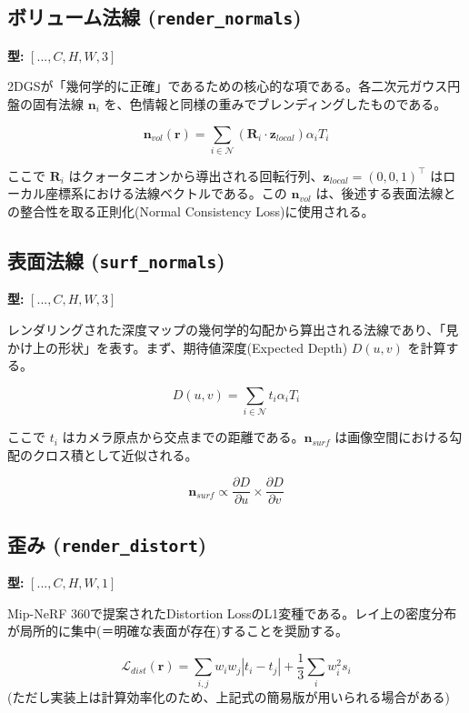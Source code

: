 \subsection{ボリューム法線 (\texttt{render\_normals})}
\textbf{型:} $[..., C, H, W, 3]$

2DGSが「幾何学的に正確」であるための核心的な項である。各二次元ガウス円盤の固有法線 $\bm{n}_i$ を、色情報と同様の重みでブレンディングしたものである。

\begin{equation}
    \bm{n}_{vol}(\bm{r}) = \sum_{i \in \mathcal{N}} (\bm{R}_i \cdot \bm{z}_{local}) \alpha_i T_i
\end{equation}

ここで $\bm{R}_i$ はクォータニオンから導出される回転行列、$\bm{z}_{local} = (0,0,1)^\top$ はローカル座標系における法線ベクトルである。この $\bm{n}_{vol}$ は、後述する表面法線との整合性を取る正則化(Normal Consistency Loss)に使用される。

\subsection{表面法線 (\texttt{surf\_normals})}
\textbf{型:} $[..., C, H, W, 3]$

レンダリングされた深度マップの幾何学的勾配から算出される法線であり、「見かけ上の形状」を表す。まず、期待値深度(Expected Depth) $D(u,v)$ を計算する。

\begin{equation}
    D(u, v) = \sum_{i \in \mathcal{N}} t_i \alpha_i T_i
\end{equation}

ここで $t_i$ はカメラ原点から交点までの距離である。$\bm{n}_{surf}$ は画像空間における勾配のクロス積として近似される。

\begin{equation}
    \bm{n}_{surf} \propto \frac{\partial D}{\partial u} \times \frac{\partial D}{\partial v}
\end{equation}

\subsection{歪み (\texttt{render\_distort})}
\textbf{型:} $[..., C, H, W, 1]$

Mip-NeRF 360で提案されたDistortion LossのL1変種である。レイ上の密度分布が局所的に集中(＝明確な表面が存在)することを奨励する。

\begin{equation}
    \mathcal{L}_{dist}(\bm{r}) = \sum_{i, j} w_i w_j |t_i - t_j| + \frac{1}{3} \sum_i w_i^2 s_i
\end{equation}
(ただし実装上は計算効率化のため、上記式の簡易版が用いられる場合がある)

